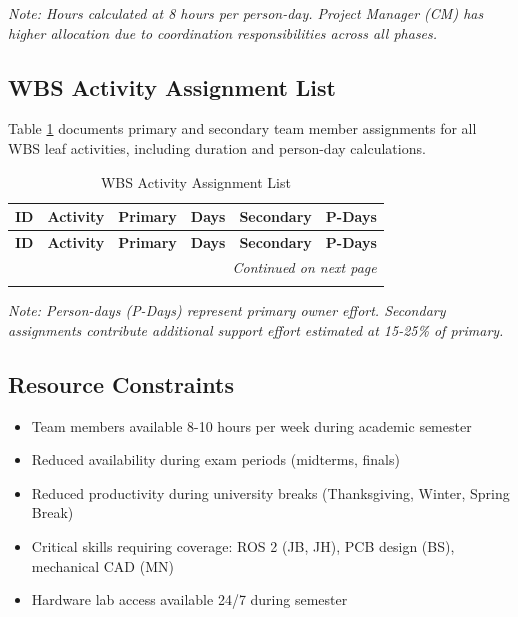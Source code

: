 \noindent\textit{Note: Hours calculated at 8 hours per person-day. Project Manager (CM) has higher allocation due to coordination responsibilities across all phases.}

\subsection{WBS Activity Assignment List}

Table \ref{tab:activity_assignments} documents primary and secondary team member assignments for all WBS leaf activities, including duration and person-day calculations.

\begin{longtable}{@{}lp{5cm}ccp{2.5cm}r@{}}
\caption{WBS Activity Assignment List} \label{tab:activity_assignments} \\
\toprule
\textbf{ID} & \textbf{Activity} & \textbf{Primary} & \textbf{Days} & \textbf{Secondary} & \textbf{P-Days} \\
\midrule
\endfirsthead
\toprule
\textbf{ID} & \textbf{Activity} & \textbf{Primary} & \textbf{Days} & \textbf{Secondary} & \textbf{P-Days} \\
\midrule
\endhead
\midrule
\multicolumn{6}{r}{\textit{Continued on next page}} \\
\endfoot
\bottomrule
\endlastfoot



\end{longtable}

\noindent\textit{Note: Person-days (P-Days) represent primary owner effort. Secondary assignments contribute additional support effort estimated at 15-25\% of primary.}

\subsection{Resource Constraints}

\begin{itemize}
    \item Team members available 8-10 hours per week during academic semester
    \item Reduced availability during exam periods (midterms, finals)
    \item Reduced productivity during university breaks (Thanksgiving, Winter, Spring Break)
    \item Critical skills requiring coverage: ROS 2 (JB, JH), PCB design (BS), mechanical CAD (MN)
    \item Hardware lab access available 24/7 during semester
\end{itemize}

